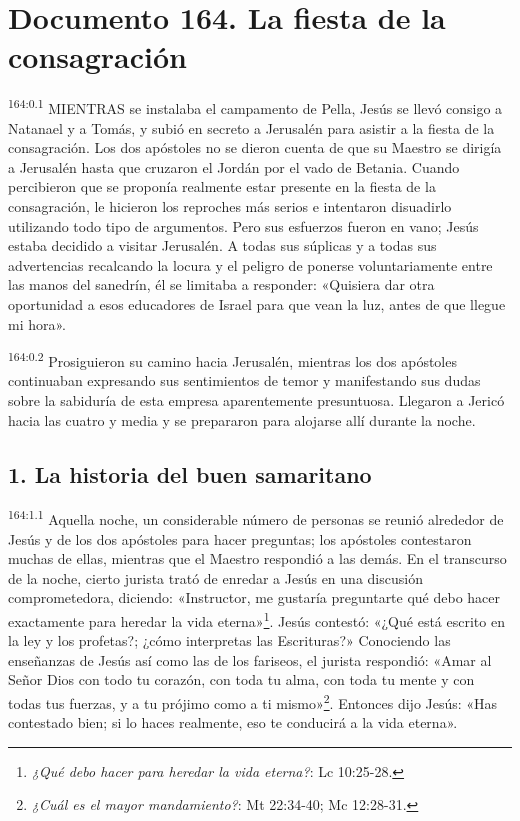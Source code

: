 \chapter{Documento 164. La fiesta de la consagración}
\par 
\textsuperscript{164:0.1} MIENTRAS se instalaba el campamento de Pella, Jesús se llevó consigo a Natanael y a Tomás, y subió en secreto a Jerusalén para asistir a la fiesta de la consagración. Los dos apóstoles no se dieron cuenta de que su Maestro se dirigía a Jerusalén hasta que cruzaron el Jordán por el vado de Betania. Cuando percibieron que se proponía realmente estar presente en la fiesta de la consagración, le hicieron los reproches más serios e intentaron disuadirlo utilizando todo tipo de argumentos. Pero sus esfuerzos fueron en vano; Jesús estaba decidido a visitar Jerusalén. A todas sus súplicas y a todas sus advertencias recalcando la locura y el peligro de ponerse voluntariamente entre las manos del sanedrín, él se limitaba a responder: «Quisiera dar otra oportunidad a esos educadores de Israel para que vean la luz, antes de que llegue mi hora».

\par 
\textsuperscript{164:0.2} Prosiguieron su camino hacia Jerusalén, mientras los dos apóstoles continuaban expresando sus sentimientos de temor y manifestando sus dudas sobre la sabiduría de esta empresa aparentemente presuntuosa. Llegaron a Jericó hacia las cuatro y media y se prepararon para alojarse allí durante la noche.

\section*{1. La historia del buen samaritano}
\par 
\textsuperscript{164:1.1} Aquella noche, un considerable número de personas se reunió alrededor de Jesús y de los dos apóstoles para hacer preguntas; los apóstoles contestaron muchas de ellas, mientras que el Maestro respondió a las demás. En el transcurso de la noche, cierto jurista trató de enredar a Jesús en una discusión comprometedora, diciendo: «Instructor, me gustaría preguntarte qué debo hacer exactamente para heredar la vida eterna»\footnote{\textit{¿Qué debo hacer para heredar la vida eterna?}: Lc 10:25-28.}. Jesús contestó: «¿Qué está escrito en la ley y los profetas?; ¿cómo interpretas las Escrituras?» Conociendo las enseñanzas de Jesús así como las de los fariseos, el jurista respondió: «Amar al Señor Dios con todo tu corazón, con toda tu alma, con toda tu mente y con todas tus fuerzas, y a tu prójimo como a ti mismo»\footnote{\textit{¿Cuál es el mayor mandamiento?}: Mt 22:34-40; Mc 12:28-31.}. Entonces dijo Jesús: «Has contestado bien; si lo haces realmente, eso te conducirá a la vida eterna».

